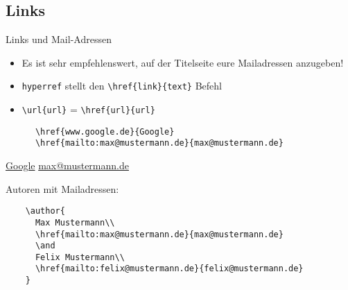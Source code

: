\subsection{Links}

\begin{frame}[fragile]{Links und Mail-Adressen}
  \begin{itemize}
    \item Es ist sehr empfehlenswert, auf der Titelseite eure Mailadressen anzugeben!
    \item \texttt{hyperref} stellt den \lstinline+\href{link}{text}+ Befehl
    \item \lstinline+\url{url}+ = \lstinline+\href{url}{url}+
  \end{itemize}
  \begin{CodeExample}{0.7}
    \begin{lstlisting}
      \href{www.google.de}{Google}
      \href{mailto:max@mustermann.de}{max@mustermann.de}
    \end{lstlisting}
    \CodeResult
    \href{www.google.de}{Google}
    \href{mailto:max@mustermann.de}{max@mustermann.de}
  \end{CodeExample}
  \begin{block}{Autoren mit Mailadressen:}
    \begin{lstlisting}
    \author{
      Max Mustermann\\
      \href{mailto:max@mustermann.de}{max@mustermann.de}
      \and
      Felix Mustermann\\
      \href{mailto:felix@mustermann.de}{felix@mustermann.de}
    }
    \end{lstlisting}
  \end{block}
\end{frame}
